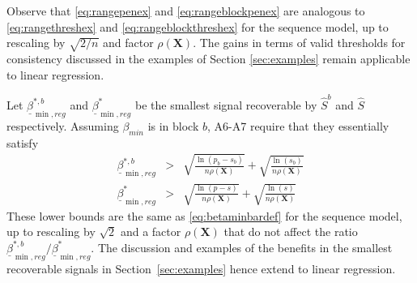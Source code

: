 \documentclass[aos]{imsart}
\theoremstyle{plain}
\newcommand{\bs}{\boldsymbol}
\begin{document}
Observe that \eqref{eq:rangepenex} and \eqref{eq:rangeblockpenex} are analogous to \eqref{eq:rangethreshex} and \eqref{eq:rangeblockthreshex} for the sequence model, up to rescaling by $\sqrt{2/n}$ and factor $\rho(\bs X)$. The gains in terms of valid thresholds for consistency discussed in the examples of Section \ref{sec:examples} remain applicable %
to linear regression. %

Let $\underline{\beta}^{*,b}_{\min,reg}$ and $\underline{\beta}^{*}_{\min,reg}$ be the smallest signal recoverable by $\hat{S}^b$ and $\hat{S}$ respectively. \color{black}
Assuming $\beta_{min}$ is in block $b$, A6-A7 require that they essentially satisfy \color{black}
\begin{eqnarray*}
    \underline{\beta}^{*,b}_{\min,reg}&>& \sqrt{\frac{\ln(p_b-s_b)}{ n\rho(\bs X)}} + \sqrt{\frac{\ln(s_b)}{ n\rho(\bs X)}} \\
    \underline{\beta}^{*}_{\min,reg}&>& \sqrt{\frac{\ln(p-s)}{ n\rho(\bs X)}} + \sqrt{\frac{\ln(s)}{ n\rho(\bs X)}} 
\end{eqnarray*}
These lower bounds are the same as \eqref{eq:betaminbardef} for the sequence model, up to rescaling by $\sqrt{2}$ and a factor $\rho(\bs X)$ that do not affect the ratio $\underline{\beta}^{*,b}_{\min,reg}/\underline{\beta}^{*}_{\min,reg}$. The discussion and examples of the benefits in the smallest recoverable signals in Section~\ref{sec:examples} hence extend to linear regression.
\end{document}
